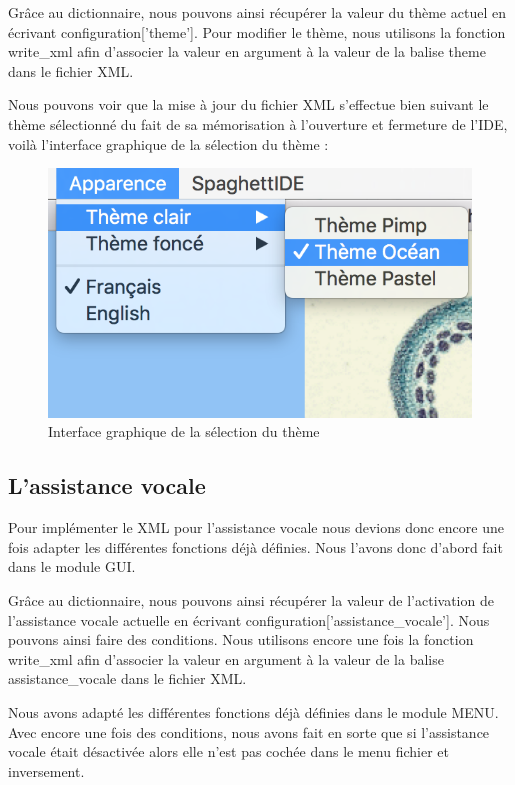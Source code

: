 \documentclass[a4paper,12pt]{article}
\begin{document}
Grâce au dictionnaire, nous pouvons ainsi récupérer la valeur du thème actuel en écrivant configuration['theme']. Pour modifier le thème, nous utilisons la fonction write\_xml afin d'associer la valeur en argument à la valeur de la balise theme dans le fichier XML. 

Nous pouvons voir que la mise à jour du fichier XML s'effectue bien suivant le thème sélectionné du fait de sa mémorisation à l'ouverture et fermeture de l'IDE, voilà l'interface graphique de la sélection du thème : 

\begin{figure}[h!]
			\begin{center}
				\includegraphics[scale=0.6]{images/themes_selection.png}
				\caption{Interface graphique de la sélection du thème}
			\end{center}
		\end{figure}

\subsection{L'assistance vocale}

Pour implémenter le XML pour l'assistance vocale nous devions donc encore une fois adapter les différentes fonctions déjà définies. Nous l'avons donc d'abord fait dans le module GUI. 

Grâce au dictionnaire, nous pouvons ainsi récupérer la valeur de l'activation de l'assistance vocale actuelle en écrivant configuration['assistance\_vocale']. Nous pouvons ainsi faire des conditions. Nous utilisons encore une fois la fonction write\_xml afin d'associer la valeur en argument à la valeur de la balise assistance\_vocale dans le fichier XML. 

Nous avons adapté les différentes fonctions déjà définies dans le module MENU. Avec encore une fois des conditions, nous avons fait en sorte que si l'assistance vocale était désactivée alors elle n'est pas cochée dans le menu fichier et inversement.
\end{document}
